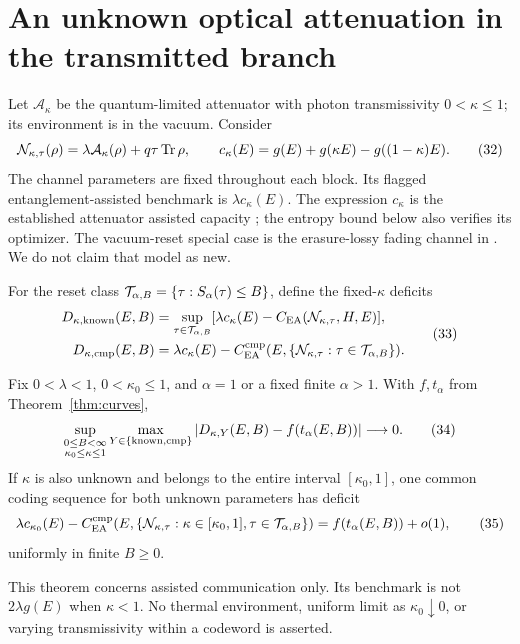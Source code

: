 \section{An unknown optical attenuation in the transmitted branch}
\label{sec:optics}
Let \(\mathcal A_\kappa\) be the quantum-limited attenuator with photon
transmissivity \(0<\kappa\le1\); its environment is in the vacuum.
Consider
\[
 \mathcal N_{\kappa,\tau}(\rho)
      =\lambda\mathcal A_\kappa(\rho)+q\tau\operatorname{Tr}\rho,\qquad
 c_\kappa(E)=g(E)+g(\kappa E)-g((1-\kappa)E).                  \tag{32}
\]
The channel parameters are fixed throughout each block. Its flagged
entanglement-assisted benchmark is \(\lambda c_\kappa(E)\).
The expression \(c_\kappa\) is the established attenuator assisted
capacity \cite{hw}; the entropy bound below also verifies its optimizer.
The vacuum-reset special case is the erasure-lossy fading channel in
\cite[Appendix F, Eq.~(F2)]{catalano}. We do not claim that model as new.

For the reset class \(\mathcal T_{\alpha,B}=\{\tau:S_\alpha(\tau)\le B\}\),
define the fixed-\(\kappa\) deficits
\[
 \begin{aligned}
 D_{\kappa,{\rm known}}(E,B)
   &=\sup_{\tau\in\mathcal T_{\alpha,B}}
          [\lambda c_\kappa(E)-C_{\mathrm{EA}}(\mathcal N_{\kappa,\tau},H,E)],\\
 D_{\kappa,\mathrm{cmp}}(E,B)
   &=\lambda c_\kappa(E)-C_{\mathrm{EA}}^{\mathrm{cmp}}
             (E,\{\mathcal N_{\kappa,\tau}:\tau\in\mathcal T_{\alpha,B}\}).
 \end{aligned}                                                 \tag{33}
\]

\begin{theorem}\label{thm:optics}
Fix \(0<\lambda<1\), \(0<\kappa_0\le1\), and \(\alpha=1\) or a
fixed finite \(\alpha>1\). With \(f,t_\alpha\) from Theorem~\ref{thm:curves},
\[
 \sup_{\substack{0\le B<\infty\\\kappa_0\le\kappa\le1}}
 \max_{Y\in\{{\rm known},\mathrm{cmp}\}}
 |D_{\kappa,Y}(E,B)-f(t_\alpha(E,B))|\longrightarrow0.           \tag{34}
\]
If \(\kappa\) is also unknown and belongs to the entire interval
\([\kappa_0,1]\), one common coding sequence for both unknown parameters
has deficit
\[
 \lambda c_{\kappa_0}(E)-C_{\mathrm{EA}}^{\mathrm{cmp}}
 (E,\{\mathcal N_{\kappa,\tau}:\kappa\in[\kappa_0,1],
                             \tau\in\mathcal T_{\alpha,B}\})
       = f(t_\alpha(E,B))+o(1),                               \tag{35}
\]
uniformly in finite \(B\ge0\).
\end{theorem}

This theorem concerns assisted communication only. Its benchmark is not
\(2\lambda g(E)\) when \(\kappa<1\). No thermal environment, uniform
limit as \(\kappa_0\downarrow0\), or varying transmissivity within a
codeword is asserted.

